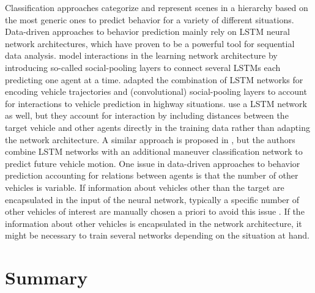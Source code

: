 Classification approaches categorize and represent scenes in a hierarchy \cite{Bonnin2012} based on the most generic ones to predict behavior for a variety of different situations.
Data-driven approaches to behavior prediction mainly rely on \ac{LSTM} neural network architectures, which have proven to be a powerful tool for sequential data analysis.
\cite{Alahi2016} model interactions in the learning network architecture by introducing so-called social-pooling layers to connect several \acp{LSTM} each predicting one agent at a time.
\cite{Deo2018a} adapted the combination of \ac{LSTM} networks for encoding vehicle trajectories and (convolutional) social-pooling layers to account for interactions to vehicle prediction in highway situations.
\cite{Altche2018} use a \ac{LSTM} network as well, but they account for interaction by including distances between the target vehicle and other agents directly in the training data rather than adapting the network architecture.
A similar approach is proposed in \cite{Deo2018}, but the authors combine \ac{LSTM} networks with an additional maneuver classification network to predict future vehicle motion.
One issue in data-driven approaches to behavior prediction accounting for relations between agents is that the number of other vehicles is variable.
If information about vehicles other than the target are encapsulated in the input of the neural network, typically a specific number of other vehicles of interest are manually chosen a priori to avoid this issue \cite{Altche2018, Deo2018}.
If the information about other vehicles is encapsulated in the network architecture, it might be necessary to train several networks depending on the situation at hand.

\section{Summary}
\label{sec:related_work_summary}
